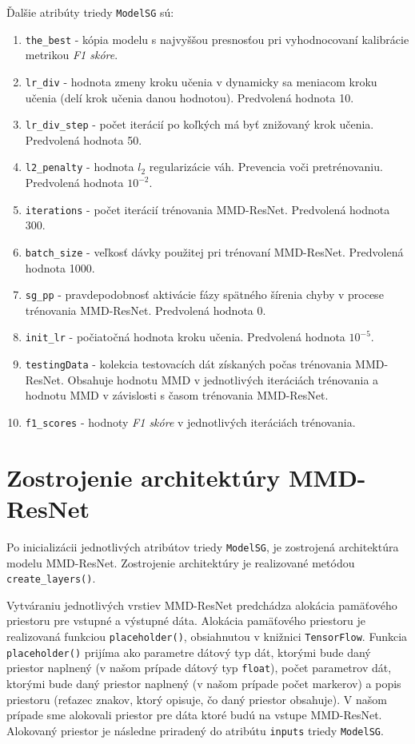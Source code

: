 Ďalšie atribúty triedy \texttt{ModelSG} sú:
\begin{enumerate}
    \item \texttt{the_best} - kópia modelu s najvyššou presnosťou pri vyhodnocovaní kalibrácie metrikou \textit{F1 skóre}.
    \item \texttt{lr_div} - hodnota zmeny kroku učenia v dynamicky sa meniacom kroku učenia (delí krok učenia danou hodnotou). Predvolená hodnota 10.
    \item \texttt{lr_div_step} - počet iterácií po koľkých má byť znižovaný krok učenia. Predvolená hodnota 50.
    \item \texttt{l2_penalty} - hodnota $l_2$ regularizácie váh. Prevencia voči pretrénovaniu. Predvolená hodnota $10^{-2}$.
    \item \texttt{iterations} - počet iterácií trénovania MMD-ResNet. Predvolená hodnota 300.
    \item \texttt{batch_size} - veľkosť dávky použitej pri trénovaní MMD-ResNet. Predvolená hodnota 1000.
    \item \texttt{sg_pp} - pravdepodobnosť aktivácie fázy spätného šírenia chyby v procese trénovania MMD-ResNet. Predvolená hodnota 0.
    \item \texttt{init_lr} - počiatočná hodnota kroku učenia. Predvolená hodnota $10^{-5}$.
    \item \texttt{testingData} - kolekcia testovacích dát získaných počas trénovania MMD-ResNet. Obsahuje hodnotu MMD v jednotlivých iteráciách trénovania a hodnotu MMD v závislosti s časom trénovania MMD-ResNet.
    \item \texttt{f1_scores} - hodnoty \textit{F1 skóre} v jednotlivých iteráciách trénovania.
\end{enumerate}

\section{Zostrojenie architektúry MMD-ResNet}

Po inicializácii jednotlivých atribútov triedy \texttt{ModelSG}, je zostrojená architektúra modelu MMD-ResNet. Zostrojenie architektúry je realizované metódou \texttt{create_layers()}. 

Vytváraniu jednotlivých vrstiev MMD-ResNet predchádza alokácia pamäťového priestoru pre vstupné a výstupné dáta. Alokácia pamäťového priestoru je realizovaná funkciou \texttt{placeholder()}, obsiahnutou v knižnici \texttt{TensorFlow}. Funkcia \texttt{placeholder()} prijíma ako parametre dátový typ dát, ktorými bude daný priestor naplnený (v našom prípade dátový typ \texttt{float}), počet parametrov dát, ktorými bude daný priestor naplnený (v našom prípade počet markerov) a popis priestoru (reťazec znakov, ktorý opisuje, čo daný priestor obsahuje). V našom prípade sme alokovali priestor pre dáta ktoré budú na vstupe MMD-ResNet. Alokovaný priestor je následne priradený do atribútu \texttt{inputs} triedy \texttt{ModelSG}.

